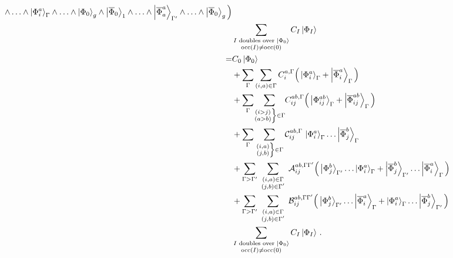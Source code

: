 \begin{equation}
\begin{split}
    \w \dots
    \w \ket{\Phi_{i}^{a}}_\irp
    \w \dots
    \w \ket{\Phi_0}_g
    \w \ket{\overline{\Phi}_0}_1
    \w \dots
    \w \ket{\overline{\Phi}_{a}^{a}}_\irpP
    \w \dots
    \w \ket{\overline{\Phi}_0}_g
    \Big)\\
    & \sum_{\substack{I\text{ doubles over }\ket{\Phi_0}\\\text{occ}(I) \ne \text{occ}(0)}}
    C_I \ket{\Phi_I}\\
    = & C_0 \ket{\Phi_0}\\
    & + \sum_\irp\sum_{(i,a) \in \irp} C_{i}^{a, \irp}
    \Big(
    \ket{\Phi_i^a}_\irp
    + \ket{\overline{\Phi}_i^a}_\irp
    \Big)\\
    & + \sum_\irp\sumijabrestr C_{ij}^{ab, \irp}
    \Big(
    \ket{\Phi_{ij}^{ab}}_\irp
    + \ket{\overline{\Phi}_{ij}^{ab}}_\irp
    \Big)\\
    & + \sum_\irp\sumijabfull\Dss_{ij}^{ab, \irp} \,
    \ket{\Phi_{i}^{a}}_\irp
    \dots
    \ket{\overline{\Phi}_{j}^{b}}_\irp\\
    & + \sum_{\irp > \irpP} \sumijabmix \Dmixaa_{ij}^{ab, \irp\irpP}
    \Big(
    \ket{\Phi_{j}^{b}}_\irpP
    \dots
    \ket{\Phi_{i}^{a}}_\irp
    + \ket{\overline{\Phi}_{j}^{b}}_\irpP
    \dots
    \ket{\overline{\Phi}_{i}^{a}}_\irp
    \Big)\\
    &  + \sum_{\irp > \irpP}\sumijabmix \Dmixab_{ij}^{ab, \irp\irpP}
    \Big(
    \ket{\Phi_{j}^{b}}_\irpP
    \dots
    \ket{\overline{\Phi}_{i}^{a}}_\irp
    + \ket{\Phi_{i}^{a}}_\irp
    \dots
    \ket{\overline{\Phi}_{j}^{b}}_\irpP
    \Big)\\
    & \sum_{\substack{I\text{ doubles over }\ket{\Phi_0}\\\text{occ}(I) \ne \text{occ}(0)}}
    C_I \ket{\Phi_I}\,.
  \end{split}
\end{equation}

